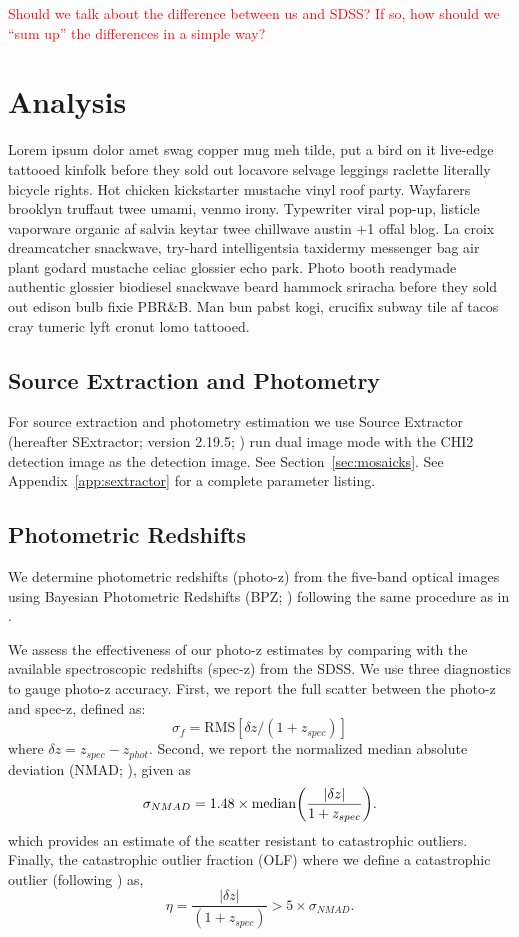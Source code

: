 \documentclass[apj, revtex4]{emulateapj}
\newcommand{\editorial}[1]{\textcolor{red}{#1}}
\begin{document}
\editorial{Should we talk about the difference between us and SDSS? If so, how should we ``sum up'' the differences in a simple way?}

\section{Analysis}\label{sec:analysis}
Lorem ipsum dolor amet swag copper mug meh tilde, put a bird on it live-edge tattooed kinfolk before they sold out locavore selvage leggings raclette literally bicycle rights. Hot chicken kickstarter mustache vinyl roof party. Wayfarers brooklyn truffaut twee umami, venmo irony. Typewriter viral pop-up, listicle vaporware organic af salvia keytar twee chillwave austin +1 offal blog. La croix dreamcatcher snackwave, try-hard intelligentsia taxidermy messenger bag air plant godard mustache celiac glossier echo park. Photo booth readymade authentic glossier biodiesel snackwave beard hammock sriracha before they sold out edison bulb fixie PBR\&B. Man bun pabst kogi, crucifix subway tile af tacos cray tumeric lyft cronut lomo tattooed.

\subsection{Source Extraction and Photometry}
For source extraction and photometry estimation we use Source Extractor (hereafter SExtractor; version 2.19.5; \citealt{Bertin1996}) run dual image mode with the CHI2 detection image as the detection image. See Section~\ref{sec:mosaicks}. See Appendix~\ref{app:sextractor} for a complete parameter listing.

\subsection{Photometric Redshifts}
We determine photometric redshifts (photo-z) from the five-band optical images using Bayesian Photometric Redshifts (BPZ; \citealt{Benitez2000, Coe2006}) following the same procedure as in \cite{Menanteau2009a}.

We assess the effectiveness of our photo-z estimates by comparing with the available spectroscopic redshifts (spec-z) from the SDSS. We use three diagnostics to gauge photo-z accuracy. First, we report the full scatter between the photo-z and spec-z, defined as:
\begin{equation}
	\sigma_f = \mathrm{RMS}[\delta z/(1+z_{spec})]
\end{equation}
where $\delta z = z_{spec} - z_{phot}$. Second, we report the normalized median absolute deviation (NMAD; \citealt{Ilbert2009, Dahlen2013, Molino2017}), given as
\begin{equation}
	\sigma_{NMAD} = 1.48 \times \mathrm{median} \bigg{(} \frac{|\delta z|}{1+z_{spec}} \bigg{)}.
\end{equation}
which provides an estimate of the scatter resistant to catastrophic outliers. Finally, the catastrophic outlier fraction (OLF) where we define a catastrophic outlier (following \citealt{Molino2017}) as,
\begin{equation}
	\eta = \frac{|\delta z|}{(1+z_{spec})} > 5 \times \sigma_{NMAD}.
\end{equation}
\end{document}
